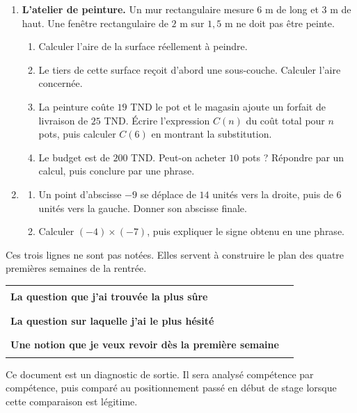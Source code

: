 \documentclass[10pt,a4paper]{article}
\begin{document}
\needspace{68mm}\par\vspace{3mm}
\begin{enumerate}
\needspace{22mm}
\item[\textbf{C1.}] \textbf{L'atelier de peinture.} Un mur rectangulaire mesure $6$ m de long et $3$ m de haut.
Une fenêtre rectangulaire de $2$ m sur $1{,}5$ m ne doit pas être peinte.
\begin{enumerate}
\item Calculer l'aire de la surface réellement à peindre.
\item Le tiers de cette surface reçoit d'abord une sous-couche. Calculer l'aire concernée.
\item La peinture coûte $19$ TND le pot et le magasin ajoute un forfait de livraison de $25$ TND.
Écrire l'expression $C(n)$ du coût total pour $n$ pots, puis calculer $C(6)$ en montrant la substitution.
\item Le budget est de $200$ TND. Peut-on acheter $10$ pots ? Répondre par un calcul, puis conclure par une phrase.
\end{enumerate}
\par\vspace{1.2mm}
\needspace{22mm}
\item[\textbf{C2.}] \begin{enumerate}
\item Un point d'abscisse $-9$ se déplace de $14$ unités vers la droite, puis de $6$ unités vers la gauche.
Donner son abscisse finale.
\item Calculer $(-4)\times(-7)$, puis expliquer le signe obtenu en une phrase.
\end{enumerate}
\par\vspace{1.2mm}
\end{enumerate}
\brouillon{\dimexpr\textheight/3\relax}
\newpage
{}
\begin{methodbox}Ces trois lignes ne sont pas notées. Elles servent à construire le plan des quatre premières semaines de la rentrée.\end{methodbox}
\par\noindent\begin{tabularx}{\linewidth}{>{\bfseries}p{62mm} X}
\toprule
La question que j'ai trouvée la plus sûre & \rule{85mm}{0.32pt} \\
La question sur laquelle j'ai le plus hésité & \rule{85mm}{0.32pt} \\
Une notion que je veux revoir dès la première semaine & \rule{85mm}{0.32pt} \\
\bottomrule\end{tabularx}
\vfill
\begin{graybox}\small Ce document est un diagnostic de sortie. Il sera analysé compétence par compétence, puis comparé au positionnement passé en début de stage lorsque cette comparaison est légitime.\end{graybox}
\end{document}
